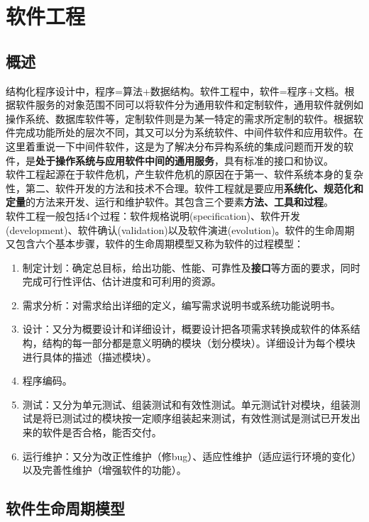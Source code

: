 \documentclass[chapter.computer_science.tex]{subfiles}
\begin{document}
\section{软件工程}
\subsection{概述}
结构化程序设计中，程序=算法+数据结构。软件工程中，软件=程序+文档。根据软件服务的对象范围不同可以将软件分为通用软件和定制软件，通用软件就例如操作系统、数据库软件等，定制软件则是为某一特定的需求所定制的软件。根据软件完成功能所处的层次不同，其又可以分为系统软件、中间件软件和应用软件。在这里着重说一下中间件软件，这是为了解决分布异构系统的集成问题而开发的软件，是{\bfseries 处于操作系统与应用软件中间的通用服务}，具有标准的接口和协议。\\
软件工程起源在于软件危机，产生软件危机的原因在于第一、软件系统本身的复杂性，第二、软件开发的方法和技术不合理。软件工程就是要应用{\bfseries 系统化、规范化和定量}的方法来开发、运行和维护软件。其包含三个要素{\bfseries 方法、工具和过程}。\\
软件工程一般包括4个过程：软件规格说明(specification)、软件开发(development)、软件确认(validation)以及软件演进(evolution)。软件的生命周期又包含六个基本步骤，软件的生命周期模型又称为软件的过程模型：\\
\begin{enumerate}
    \item 制定计划：确定总目标，给出功能、性能、可靠性及{\bfseries 接口}等方面的要求，同时完成可行性评估、估计进度和可利用的资源。
    \item 需求分析：对需求给出详细的定义，编写需求说明书或系统功能说明书。
    \item 设计：又分为概要设计和详细设计，概要设计把各项需求转换成软件的体系结构，结构的每一部分都是意义明确的模块（划分模块）。详细设计为每个模块进行具体的描述（描述模块）。
    \item 程序编码。
    \item 测试：又分为单元测试、组装测试和有效性测试。单元测试针对模块，组装测试是将已测试过的模块按一定顺序组装起来测试，有效性测试是测试已开发出来的软件是否合格，能否交付。
    \item 运行维护：又分为改正性维护（修bug）、适应性维护（适应运行环境的变化）以及完善性维护（增强软件的功能）。
\end{enumerate}
\subsection{软件生命周期模型}
\end{document}
